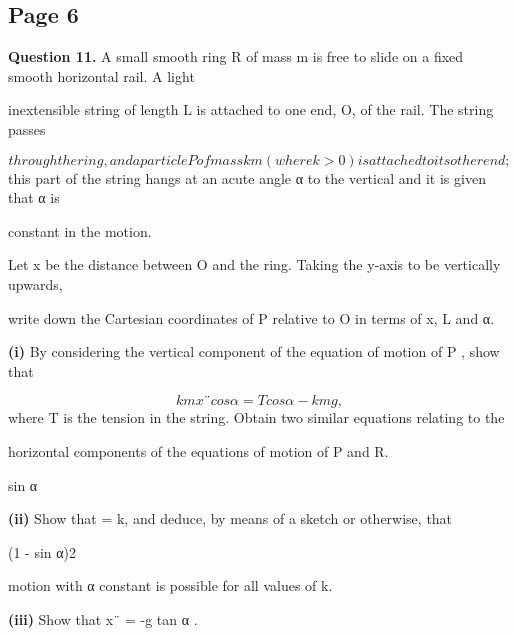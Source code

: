 \documentclass[12pt]{article}
\begin{document}
\subsection*{Page 6}
\begin{flushleft}
\bigskip\textbf{Question 11.} A small smooth ring R of mass m is free to slide on a fixed smooth horizontal rail. A light\par
inextensible string of length L is attached to one end, O, of the rail. The string passes\par
\[through the ring, and a particle P of mass km (where k > 0) is attached to its other end;\]
this part of the string hangs at an acute angle α to the vertical and it is given that α is\par
constant in the motion.\par
Let x be the distance between O and the ring. Taking the y-axis to be vertically upwards,\par
write down the Cartesian coordinates of P relative to O in terms of x, L and α.\par
\textbf{(i)} By considering the vertical component of the equation of motion of P , show that\par
\[kmx¨ cos α = T cos α - kmg ,\]
where T is the tension in the string. Obtain two similar equations relating to the\par
horizontal components of the equations of motion of P and R.\par
sin α\par
\textbf{(ii)} Show that = k, and deduce, by means of a sketch or otherwise, that\par
(1 - sin α)2\par
motion with α constant is possible for all values of k.\par
\textbf{(iii)} Show that x¨ = -g tan α .\par
\end{flushleft}
\end{document}

